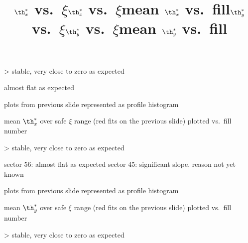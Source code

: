 \centerline{}

\>> stable, very close to zero as expected


\newpage %
\title{$\th^*_x$ vs.~$\xi$}

\centerline{}

\> almost flat as expected


\newpage %
\title{$\th^*_x$ vs.~$\xi$}

\> plots from previous slide represented as profile histogram

\centerline{}

\newpage %
\title{mean $\th^*_x$ vs.~fill}

\> mean $\th^*_x$ over safe $\xi$ range (red fits on the previous slide) plotted vs.~fill number

\centerline{}

\>> stable, very close to zero as expected



\newpage %
\title{$\th^*_y$ vs.~$\xi$}

\centerline{}

\> sector 56: almost flat as expected
\> sector 45: significant slope, reason not yet known

\newpage %
\title{$\th^*_y$ vs.~$\xi$}

\> plots from previous slide represented as profile histogram

\centerline{}


\newpage %
\title{mean $\th^*_y$ vs.~fill}

\> mean $\th^*_y$ over safe $\xi$ range (red fits on the previous slide) plotted vs.~fill number

\centerline{}

\>> stable, very close to zero as expected

\vfil
\eject
\bye
